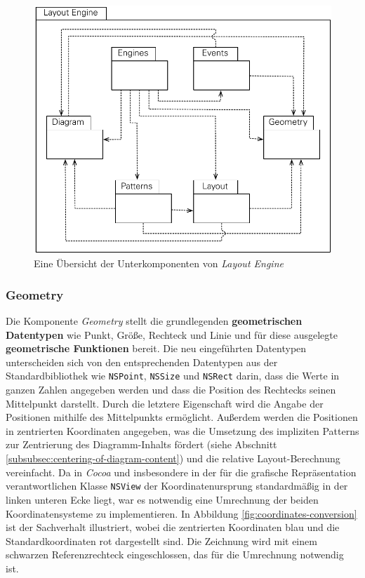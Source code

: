 \begin{figure}[hbt]
    \centering
    \includegraphics[scale=0.85]{assets/layout-engine-subcomponents}
    \caption{Eine Übersicht der Unterkomponenten von \textit{Layout Engine}}
    \label{fig:layout-engine-subcomponents}
\end{figure}

\subsubsection{Geometry}
\label{subsubsec:geometry}

Die Komponente \textit{Geometry} stellt die grundlegenden \textbf{geometrischen Datentypen} wie Punkt, Größe, Rechteck und Linie und für diese ausgelegte \textbf{geometrische Funktionen} bereit. Die neu eingeführten Datentypen unterscheiden sich von den entsprechenden Datentypen aus der Standardbibliothek wie \texttt{NSPoint}, \texttt{NSSize} und \texttt{NSRect} darin, dass die Werte in ganzen Zahlen angegeben werden und dass die Position des Rechtecks seinen Mittelpunkt darstellt. Durch die letztere Eigenschaft wird die Angabe der Positionen mithilfe des Mittelpunkts ermöglicht. Außerdem werden die Positionen in zentrierten Koordinaten angegeben, was die Umsetzung des impliziten Patterns zur Zentrierung des Diagramm-Inhalts fördert (siehe Abschnitt \ref{subsubsec:centering-of-diagram-content}) und die relative Layout-Berechnung vereinfacht. Da in \textit{Cocoa} und insbesondere in der für die grafische Repräsentation verantwortlichen Klasse \texttt{NSView} der Koordinatenursprung standardmäßig in der linken unteren Ecke liegt, war es notwendig eine Umrechnung der beiden Koordinatensysteme zu implementieren. In Abbildung \ref{fig:coordinates-conversion} ist der Sachverhalt illustriert, wobei die zentrierten Koordinaten blau und die Standardkoordinaten rot dargestellt sind. Die Zeichnung wird mit einem schwarzen Referenzrechteck eingeschlossen, das für die Umrechnung notwendig ist.

